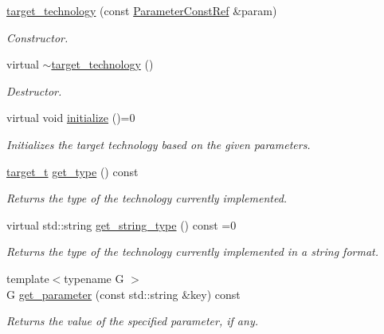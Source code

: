 \begin{DoxyCompactItemize}
\item 
\hyperlink{classtarget__technology_a5e939d5581b952ea83d34d496d1d2965}{target\+\_\+technology} (const \hyperlink{Parameter_8hpp_a37841774a6fcb479b597fdf8955eb4ea}{Parameter\+Const\+Ref} \&param)
\begin{DoxyCompactList}\small\item\em Constructor. \end{DoxyCompactList}\item 
virtual \hyperlink{classtarget__technology_a12b5a2b034e285b90565eb00c6054773}{$\sim$target\+\_\+technology} ()
\begin{DoxyCompactList}\small\item\em Destructor. \end{DoxyCompactList}\item 
virtual void \hyperlink{classtarget__technology_a1fc1fd2d6ccfa9e748f54a4aeac33b51}{initialize} ()=0
\begin{DoxyCompactList}\small\item\em Initializes the target technology based on the given parameters. \end{DoxyCompactList}\item 
\hyperlink{classtarget__technology_a84257c2d384aa7dce6a060105113459b}{target\+\_\+t} \hyperlink{classtarget__technology_a4edc5ba729f24a445c0f5edb37d5f44b}{get\+\_\+type} () const
\begin{DoxyCompactList}\small\item\em Returns the type of the technology currently implemented. \end{DoxyCompactList}\item 
virtual std\+::string \hyperlink{classtarget__technology_a53355954503841a8ead7a8dc9889af85}{get\+\_\+string\+\_\+type} () const =0
\begin{DoxyCompactList}\small\item\em Returns the type of the technology currently implemented in a string format. \end{DoxyCompactList}\item 
{\footnotesize template$<$typename G $>$ }\\G \hyperlink{classtarget__technology_a92e316c35a7954c97093afe27e333e0b}{get\+\_\+parameter} (const std\+::string \&key) const
\begin{DoxyCompactList}\small\item\em Returns the value of the specified parameter, if any. \end{DoxyCompactList}\item 

\end{DoxyCompactItemize}
